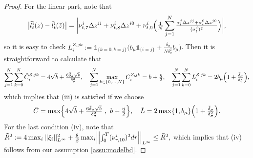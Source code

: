 \documentclass[10pt,a4paper]{article}
\newcommand{\bL}{\bar{L}}
\newcommand{\bC}{\bar{C}}
\newcommand{\bR}{\bar{R}}
\theoremstyle{plain}
\theoremstyle{definition}
\numberwithin{equation}{section}
\begin{document}
\begin{proof}
For the linear part, note that
$$
\big|\tilde{l}_{t}^{i}(z)-\tilde{l}_{t}^{i}(\bar{z})\big| = \bigg|\nu_{t,7}^{i}\Delta z^{ii} + \nu_{t,8}^{i}\Delta z^{i0} + \nu_{t,9}^{i}\Bigl(\tfrac{1}{N}\sum_{j=1}^{N}\tfrac{\sigma_{t}^{j}\Delta z^{jj}+\sigma_{t}^{0}\Delta z^{j0}}{(\bar{\sigma}_{t}^{j})^{2}}\Bigr)\bigg|,
$$
so it is easy to check
${L}_{i}^{Z,jk} := \mathds{1}_{\{k=0,k=j\}}\bigl(b_{\mu}  \mathds{1}_{\{i=j\}} + \tfrac{\bar{\delta}_{\sigma}}{N\delta_{\sigma}^{2}}b_{\mu}\bigr)$.
Then it is straightforward to calculate that
\begin{align*}
\sum_{j=1}^{N}\sum_{k=0}^{N} \tilde{C}_{i}^{Z,jk} = 4\sqrt{b} + \tfrac{6\bar{\delta}_{\sigma}\sqrt{b}}{\delta_{\sigma}^{2}} , \ \ \  \sum_{j=1}^{N}\max_{k \in \{0,...,N\}}C_{i}^{Z,jk} = b + \tfrac{\eta}{2} , \ \ \ \sum_{j=1}^{N}\sum_{k=0}^{N} L_{i}^{Z,jk} = 2b_{\mu}\Bigl(1+\tfrac{\bar{\delta}_{\sigma}}{\delta_{\sigma}^{2}}\Bigr),
\end{align*}
which implies that (iii) is satisfied if we choose
\[
\bC = \max\Bigl\{4\sqrt{b} + \tfrac{6\bar{\delta}_{\sigma}\sqrt{b}}{\delta_{\sigma}^{2}} \ , \ b + \tfrac{\eta}{2}\Bigr\}, \  \ \ 
\bL =   2\max\{1,b_{\mu}\}\Bigl(1+\tfrac{\bar{\delta}_{\sigma}}{\delta_{\sigma}^{2}}\Bigr).
\]
For the last condition (iv), note that
$
\tilde{R}^{2} := 4 \max_{i} ||\xi_{i}||_{L^{\infty}}^{2} + \tfrac{8}{\bar{\beta} }  \max_{i} \Bigl|\Bigl|\int_{0}^{T}(\nu_{r,10}^{i})^{2}dr\Bigr|\Bigr|_{L^{\infty}} \le \bR^{2},
$
which implies that (iv) follows from our assumption \eqref{assu:modelbd}.


 

\end{proof}
\end{document}
